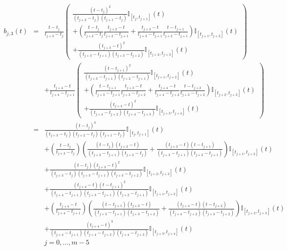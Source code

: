 \documentclass {article}
\begin{document}
\begin{eqnarray*}
b_{j,3}(t) &=& \frac{t - t_j}{t_{j+3} - t_j} 
\left(\begin{array}{l}
\frac{(t - t_j)^2}{(t_{j+2} - t_j)(t_{j+1} - t_j)}\mathbb{I}_{[t_j, t_{j+1}]}(t) \\
+ (\frac{t - t_j}{t_{j+2} - t_j}\frac{t_{j+2} - t}{t_{j+2} - t_{j+1}}+
\frac{t_{j+3} - t}{t_{j+3} - t_{j+1}}\frac{t - t_{j+1}}{t_{j+2} - t_{j+1}})
\mathbb{I}_{[t_{j+1}, t_{j+2}]}(t) \\
+\frac{(t_{j+3} - t)^2}{(t_{j+3} - t_{j+1})(t_{j+3} - t_{j+2})} \mathbb{I}_{[t_{j+2}, t_{j+3}]}(t)
\end{array}\right) \\
&&+ \frac{t_{j+4} - t}{t_{j+4} - t_{j+1}}
\left(\begin{array}{l}\frac{(t - t_{j+1})^2}{(t_{j+3} - t_{j+1})(t_{j+2} - t_{j+1})}\mathbb{I}_{[t_{j+1}, t_{j+2}]}(t) \\
+ (\frac{t - t_{j+1}}{t_{j+3} - t_{j+1}}\frac{t_{j+3} - t}{t_{j+3} - t_{j+2}}+
\frac{t_{j+4} - t}{t_{j+4} - t_{j+2}}\frac{t - t_{j+2}}{t_{j+3} - t_{j+2}})
\mathbb{I}_{[t_{j+2}, t_{j+3}]}(t) \\
+\frac{(t_{j+4} - t)^2}{(t_{j+4} - t_{j+2})(t_{j+4} - t_{j+3})} \mathbb{I}_{[t_{j+3}, t_{j+4}]}(t)
\end{array}\right)\\
&=& \frac{(t - t_j)^3}{(t_{j+3} - t_j)(t_{j+2} - t_j)(t_{j+1} - t_j)}\mathbb{I}_{[t_j, t_{j+1}]}(t) \\
&&+ (\frac{t - t_j}{t_{j+3} - t_j})(\frac{(t - t_j)(t_{j+2} - t)}{(t_{j+2} - t_{j+1})(t_{j+2} - t_j)}+
\frac{(t_{j+3} - t)(t - t_{j+1})}{(t_{j+3} - t_{j+1})(t_{j+2} - t_{j+1})})
\mathbb{I}_{[t_{j+1}, t_{j+2}]}(t) \\
&&+\frac{(t - t_j)(t_{j+3} - t)^2}{(t_{j+3} - t_j)(t_{j+3} - t_{j+1})(t_{j+3} - t_{j+2})} \mathbb{I}_{[t_{j+2}, t_{j+3}]}(t)\\
&&+\frac{(t_{j+4} - t)(t - t_{j+1})^2}{(t_{j+4} - t_{j+1})(t_{j+3} - t_{j+1})(t_{j+2} - t_{j+1})}\mathbb{I}_{[t_{j+1}, t_{j+2}]}(t) \\
&&+(\frac{t_{j+4} - t}{t_{j+4} - t_{j+1}})(\frac{(t - t_{j+1})(t_{j+3} - t)}{(t_{j+3} - t_{j+1})(t_{j+3} - t_{j+2})}+
\frac{(t_{j+4} - t)(t - t_{j+2})}{(t_{j+4} - t_{j+2})(t_{j+3} - t_{j+2})})
\mathbb{I}_{[t_{j+2}, t_{j+3}]}(t) \\
&&+\frac{(t_{j+4} - t)^3}{(t_{j+4} - t_{j+1})(t_{j+4} - t_{j+2})(t_{j+4} - t_{j+3})} \mathbb{I}_{[t_{j+3}, t_{j+4}]}(t)\\
&&j=0,\ldots, m-5
\end{eqnarray*}
\end{document}
